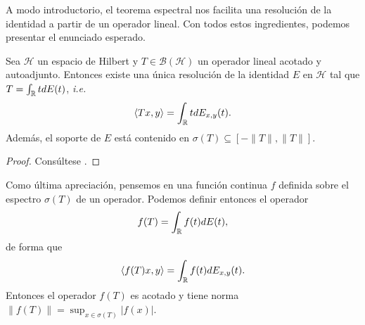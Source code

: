     A modo introductorio, el teorema espectral nos facilita una resolución de la identidad a partir de un operador lineal. Con todos estos ingredientes, podemos presentar el enunciado esperado.

    \begin{teorema}
        \label{th:espectral}

        Sea $\mathcal{H}$ un espacio de Hilbert y $T\in\mathcal{B}(\mathcal{H})$ un operador lineal acotado y autoadjunto. Entonces existe una única resolución de la identidad $E$ en $\mathcal{H}$ tal que $T=\int_{\mathbb{R}} t dE(t)$, \textit{i.e.}
        \begin{equation}
            \label{eq:teorema-espectral}
            \left\langle Tx , y \right\rangle = \int_{\mathbb{R}} t dE_{x,y}(t).
        \end{equation}
        Además, el soporte de $E$ está contenido en $\sigma(T)\subseteq[-\|T\|,\|T\|]$.
    \end{teorema}
    \begin{proof}
        Consúltese \cite[Theorem 12.22]{rudin}.
    \end{proof}

    Como última apreciación, pensemos en una función continua $f$ definida sobre el espectro $\sigma(T)$ de un operador. Podemos definir entonces el operador
    $$
    f(T)=\int_{\mathbb{R}} f(t) dE(t),
    $$
    de forma que
    $$
    \left\langle f(T)x , y \right\rangle=\int_{\mathbb{R}} f(t)d E_{x,y}(t).
    $$
    Entonces el operador $f(T)$ es acotado y tiene norma $\|f(T)\|=\displaystyle\sup_{x\in\sigma(T)}|f(x)|$.

    